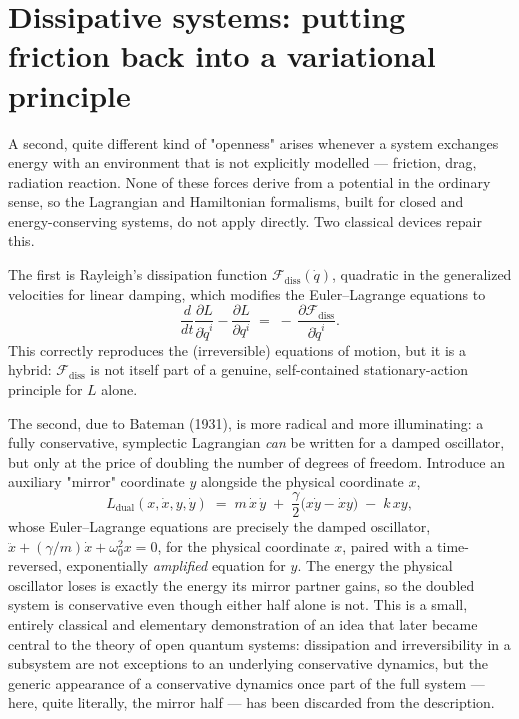 \section{Dissipative systems: putting friction back into a
  variational principle}

A second, quite different kind of "openness" arises whenever a
system exchanges energy with an environment that is not explicitly
modelled --- friction, drag, radiation reaction. None of these
forces derive from a potential in the ordinary sense, so the
Lagrangian and Hamiltonian formalisms, built for closed and
energy-conserving systems, do not apply directly. Two classical
devices repair this.

The first is Rayleigh's dissipation function $\mathcal
F_{\mathrm{diss}}(\dot q)$, quadratic in the generalized velocities
for linear damping, which modifies the Euler--Lagrange equations to
\begin{equation}
  \frac{d}{dt}\frac{\partial L}{\partial \dot q^i}
  - \frac{\partial L}{\partial q^i}
  \;=\; -\,\frac{\partial \mathcal F_{\mathrm{diss}}}{\partial \dot
  q^i}.
  \label{rayleigh}
\end{equation}
This correctly reproduces the (irreversible) equations of motion,
but it is a hybrid: $\mathcal F_{\mathrm{diss}}$ is not itself part
of a genuine, self-contained stationary-action principle for $L$
alone.

The second, due to Bateman (1931), is more radical and more
illuminating: a fully conservative, symplectic Lagrangian \emph{can}
be written for a damped oscillator, but only at the price of
doubling the number of degrees of freedom. Introduce an auxiliary
"mirror" coordinate $y$ alongside the physical coordinate $x$,
\begin{equation}
  L_{\mathrm{dual}}(x,\dot x,y,\dot y) \;=\;
  m\,\dot x\,\dot y \;+\; \frac{\gamma}{2}\bigl(x\dot y - \dot x
  y\bigr) \;-\; k\,xy ,
  \label{bateman}
\end{equation}
whose Euler--Lagrange equations are precisely the damped oscillator,
$\ddot x + (\gamma/m)\dot x + \omega_0^2 x = 0$, for the physical
coordinate $x$, paired with a time-reversed, exponentially
\emph{amplified} equation for $y$. The energy the
physical oscillator loses is exactly the energy its mirror partner
gains, so the doubled system is conservative even though either half
alone is not. This is a small, entirely classical and elementary
demonstration of an idea that later became central to the theory of
open quantum systems: dissipation and irreversibility in a subsystem
are not exceptions to an underlying conservative dynamics, but the
generic appearance of a conservative dynamics once part of the full
system --- here, quite literally, the mirror half --- has been
discarded from the description.


